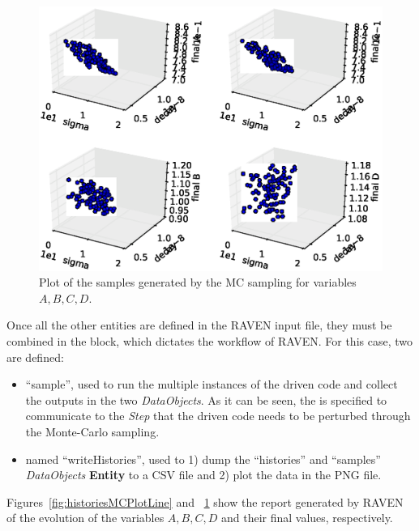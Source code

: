 \begin{enumerate}
\begin{figure}[h!]
  \includegraphics[scale=0.7]{../../tests/framework/user_guide/ForwardSamplingStrategies/gold/RunDir/MonteCarlo/1-samplesPlot3D_scatter-scatter-scatter-scatter.eps}
  \caption{Plot of the samples generated by the MC sampling for variables $A,B,C,D$.}
  \label{fig:samplesMCPlotLine}
 \end{figure}
   Once all the other entities are defined in the RAVEN input file, they must be combined in the
    block, which dictates the workflow of RAVEN.  For this case,
   two  are defined:
   \begin{itemize}
     \item {} ``sample'', used to run the multiple
     instances of the driven code and
     collect the outputs in the two \textit{DataObjects}. As it can be
     seen, the  is specified to communicate to the
     \textit{Step} that the driven code needs to
     be perturbed through the Monte-Carlo sampling.
     \item  {} named ``writeHistories'', used to 1) dump
     the ``histories'' and ``samples'' \textit{DataObjects}
     \textbf{Entity} to a CSV file and 2) plot the data in the PNG file.
   \end{itemize}
\end{enumerate}
 Figures~\ref{fig:historiesMCPlotLine} and ~\ref{fig:samplesMCPlotLine} show the report
 generated by RAVEN of the evolution of the
 variables $A,B,C,D$ and their final values, respectively.
